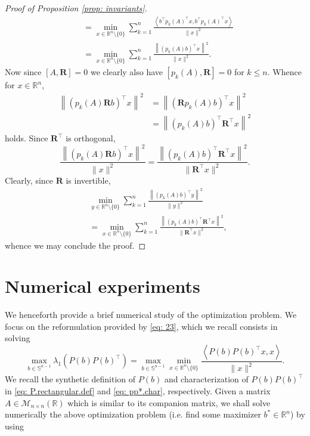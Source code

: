 \documentclass[journal,twoside,web]{ieeecolor}
\newcommand{\R}{\mathbb{R}}
\def\*#1{\mathbf{#1}}
\begin{document}
\begin{proof}[Proof of Proposition \ref{prop: invariants}]
\begin{align*}
	 &=  \min_{x \in \R^n \setminus\{0\}} \sum_{k=1}^n \frac{\left\langle b^\top p_k(A)^\top x, b^\top p_k(A)^\top x\right\rangle}{\|x\|^2} \\
	 &= \min_{x \in \R^n \setminus\{0\}} \sum_{k=1}^n \frac{\left\|(p_k(A)b)^\top x\right\|^2}{\|x\|^2}.
	\end{align*}
	Now since $[A, \*R]=0$ we clearly also have $[p_k(A), \*R]=0$ for $k\leqslant n$. Whence for $x\in\R^n$,
	\begin{align*}
	\left\|(p_k(A)\*Rb)^\top x \right\|^2 &= \left\|(\*Rp_k(A)b)^\top x \right\|^2 \\
	&= \left\|(p_k(A)b)^\top \*R^\top x \right\|^2
	\end{align*}
	holds. Since $\*R^\top$ is orthogonal, 
	\begin{equation*}
	\frac{\left\|(p_k(A)\*Rb)^\top x \right\|^2}{\|x\|^2} =  \frac{\left\|(p_k(A)b)^\top \*R^\top x \right\|^2}{\|\*R^\top x\|^2}.
	\end{equation*}
	Clearly, since $\*R$ is invertible, 
	\begin{align*}
	&\min_{y \in \R^n \setminus\{0\}} \sum_{k=1}^n \frac{\left\|(p_k(A)b)^\top y\right\|^2}{\|y\|^2} \\
	&= \min_{x \in \R^n \setminus\{0\}} \sum_{k=1}^n   \frac{\left\|(p_k(A)b)^\top \*R^\top x \right\|^2}{\|\*R^\top x\|^2},
	\end{align*}
	whence we may conclude the proof.
	\end{proof}


	\section{Numerical experiments} \label{sec: numerics} 
	
	We henceforth provide a brief numerical study of the optimization problem. We focus on the reformulation provided by \eqref{eq: 23}, which we recall consists in solving
	\begin{equation}
	\max_{b\in\mathbb{S}^{n-1}} \lambda_1\left(P(b)P(b)^\top\right) = \max_{b\in\mathbb{S}^{n-1}} \min_{x\in \R^n\setminus\{0\}} \frac{\left\langle P(b)P(b)^\top x,x\right\rangle}{\|x\|^2}.
	\end{equation}
	We recall the synthetic definition of $P(b)$ and characterization of $P(b)P(b)^\top$ in \eqref{eq: P.rectangular.def} and \eqref{eq: pp*.char}, respectively. Given a matrix $A\in\mathcal{M}_{n\times n}(\R)$ which is similar to its companion matrix, we shall solve numerically the above optimization problem (i.e. find some maximizer $b^*\in\R^n$) by using 
\end{document}
